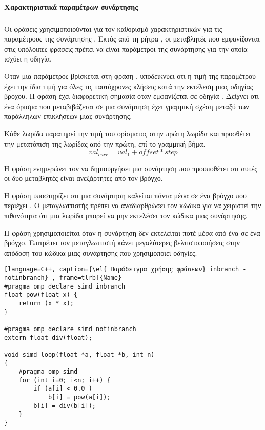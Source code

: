 \paragraph{Χαρακτηριστικά παραμέτρων συνάρτησης \emph{}}
\subparagraph{}
Οι φράσεις \emph{} χρησιμοποιούνται για τον καθορισμό χαρακτηριστικών για τις παραμέτρους της συνάρτησης \emph{}. Εκτός από τη ρήτρα \emph{}, οι μεταβλητές που εμφανίζονται στις υπόλοιπες φράσεις πρέπει να είναι παράμετροι της συνάρτησης για την οποία ισχύει η οδηγία.

Οταν μια παράμετρος βρίσκεται στη φράση \emph{}, υποδεικνύει οτι η τιμή της παραμέτρου έχει την ίδια τιμή για όλες τις ταυτόχρονες κλήσεις κατά την εκτέλεση μιας οδηγίας \emph{} βρόχου.
Η φράση \emph{} έχει διαφορετική σημασία όταν εμφανίζεται σε οδηγία \emph{}. Δείχνει οτι ένα όρισμα που μεταβιβάζεται σε μια συνάρτηση έχει γραμμική σχέση μεταξύ των παράλληλων επικλήσεων μιας συνάρτησης.

Κάθε \emph{} λωρίδα παρατηρεί την τιμή του ορίσματος στην πρώτη λωρίδα και προσθέτει την μετατόπιση της \emph{} λωρίδας από την πρώτη, επί το γραμμική βήμα.
$$val_{curr} = val_1 + offset * step $$

Η φράση \emph{} ενημερώνει τον \emph{} να δημιουργήσει μια \emph{} συνάρτηση που προυποθέτει οτι αυτές οι δύο μεταβλητές είναι ανεξάρτητες από τον βρόγχο.

Η φράση \emph{} υποστηρίζει οτι μια συνάρτηση καλείται πάντα μέσα σε ένα βρόγχο \emph{} που περιέχει \emph{}. Ο μεταγλωττιστής πρέπει να αναδιαρθρώσει τον κώδικα για να χειριστεί την πιθανότητα ότι μια λωρίδα \emph{} μπορεί να μην εκτελέσει τον κώδικα μιας συνάρτησης.

Η φράση \emph{} χρησιμοποιείται όταν η συνάρτηση δεν εκτελείται ποτέ μέσα από ένα \emph{} σε ένα \emph{} βρόγχο. Επιτρέπει τον μεταγλωττιστή κάνει μεγαλύτερες βελτιστοποιήσεις στην απόδοση του κώδικα μιας συνάρτησης που χρησιμοποιεί \emph{} οδηγίες.

\begin{lstlisting}[language=C++, caption={\el{ Παράδειγμα χρήσης φράσεων} inbranch - notinbranch} , frame=tlrb]{Name}
#pragma omp declare simd inbranch
float pow(float x) {
	return (x * x);
}

#pragma omp declare simd notinbranch
extern float div(float);

void simd_loop(float *a, float *b, int n)
{
	#pragma omp simd
	for (int i=0; i<n; i++) {
		if (a[i] < 0.0 )
			b[i] = pow(a[i]);
		b[i] = div(b[i]);
	}
}
\end{lstlisting}

